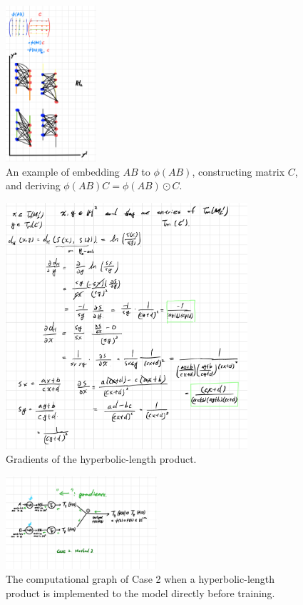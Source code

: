 \documentclass{article}
\theoremstyle{plain}
\theoremstyle{plain} %
\theoremstyle{definition}  %
\theoremstyle{remark}  %
\theoremstyle{plain}
\begin{document}
\begin{figure}[H]
\caption{An example of embedding $AB$ to $\phi(AB)$, constructing matrix $C$, and deriving $\phi(AB)C=\phi(AB)\odot C$.}
\centering
\includegraphics[width=0.3\textwidth]{9.png}
\end{figure}

\begin{figure}[H]
\caption{Gradients of the hyperbolic-length product.}
\centering
\includegraphics[width=0.8\textwidth]{6.png}
\end{figure}

\begin{figure}[H]
\caption{The computational graph of Case 2 when a hyperbolic-length product is implemented to the model directly before training.}
\centering
\includegraphics[width=0.5\textwidth]{5.png}
\end{figure}
\end{document}
